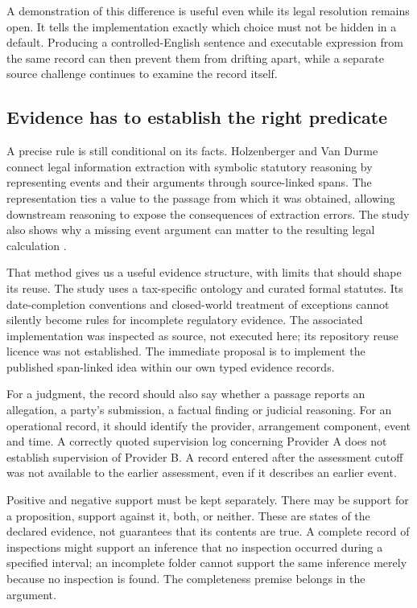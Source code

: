 A demonstration of this difference is useful even while its legal resolution
remains open. It tells the implementation exactly which choice must not be
hidden in a default. Producing a controlled-English sentence and executable
expression from the same record can then prevent them from drifting apart,
while a separate source challenge continues to examine the record itself.

\subsection{Evidence has to establish the right predicate}

A precise rule is still conditional on its facts. Holzenberger and Van Durme
connect legal information extraction with symbolic statutory reasoning by
representing events and their arguments through source-linked spans.
The representation ties a value to the passage from which it was obtained,
allowing downstream reasoning to expose the consequences of extraction errors.
The study also shows why a missing event argument can matter to the resulting
legal calculation \citep[secs.~3--5 and apps.~B, C and E]{connecting2023}.

That method gives us a useful evidence structure, with limits that should
shape its reuse. The study uses a tax-specific ontology and curated formal
statutes. Its date-completion conventions and closed-world treatment of
exceptions cannot silently become rules for incomplete regulatory evidence.
The associated implementation was inspected as source, not executed here;
its repository reuse licence was not established. The immediate proposal is
to implement the published span-linked idea within our own typed evidence
records.

For a judgment, the record should also say whether a passage reports an
allegation, a party's submission, a factual finding or judicial reasoning.
For an operational record, it should identify the provider, arrangement
component, event and time. A correctly quoted supervision log concerning
Provider A does not establish supervision of Provider B. A record entered
after the assessment cutoff was not available to the earlier assessment,
even if it describes an earlier event.

Positive and negative support must be kept separately. There may be support
for a proposition, support against it, both, or neither. These are states of
the declared evidence, not guarantees that its contents are true. A complete
record of inspections might support an inference that no inspection occurred
during a specified interval; an incomplete folder cannot support the same
inference merely because no inspection is found. The completeness premise
belongs in the argument.

